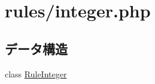 \hypertarget{integer_8php}{
\section{rules/integer.php}
\label{integer_8php}
}
\subsection*{データ構造}
\begin{DoxyCompactItemize}
\item 
class \hyperlink{class_rule_integer}{\-Rule\-Integer}
\end{DoxyCompactItemize}
